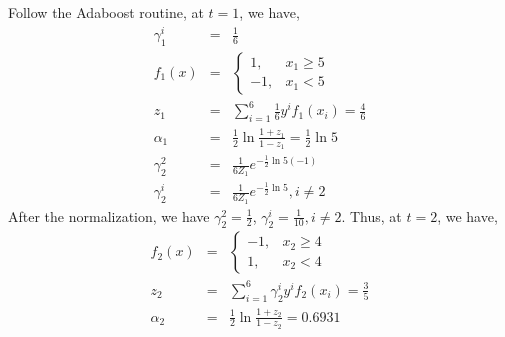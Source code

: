 \documentclass[12pt]{article}
\begin{document}
\subsection{}
Follow the Adaboost routine, at $t = 1$, we have,
\begin{eqnarray}
    \gamma_1^{i} &=& \frac{1}{6} \nonumber \\
    f_1(x) &=& \begin{cases}
        1, & x_1 \ge 5 \\
        -1, & x_1 < 5
        \end{cases} \nonumber \\
    z_1 &=& \sum_{i = 1}^{6} \frac{1}{6} y^{i} f_1(x_i) = \frac{4}{6} \nonumber \\
    \alpha_1 &=& \frac{1}{2}\ln\frac{1 + z_1}{1 - z_1} = \frac{1}{2}\ln 5 \nonumber \\
    \gamma_2^2 &=& \frac{1}{6 Z _1}e^{-\frac{1}{2}\ln 5 (-1)} \nonumber \\
    \gamma_2^i &=& \frac{1}{6 Z _1}e^{-\frac{1}{2}\ln 5 }, i \ne 2 \nonumber 
\end{eqnarray}
After the normalization, we have $\gamma_2^2 = \frac{1}{2}$, $\gamma_2^i = \frac{1}{10}, i \ne 2$. Thus, at $t = 2$, we have,
\begin{eqnarray}
    f_2(x) &=& \begin{cases}
        -1, & x_2 \ge 4 \\
        1, & x_2 < 4
        \end{cases} \nonumber \\
    z_2 &=& \sum_{i = 1}^{6} \gamma_2^i y^{i} f_2(x_i) = \frac{3}{5} \nonumber \\
    \alpha_2 &=& \frac{1}{2}\ln\frac{1 + z_2}{1 - z_2} = 0.6931 \nonumber 
\end{eqnarray}
\end{document}
